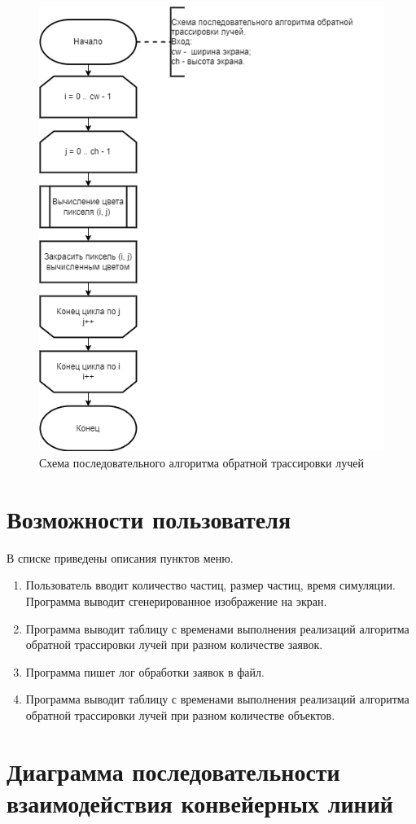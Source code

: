 \captionsetup{justification=centering,singlelinecheck=true}
\begin{figure}[H]
	\centering
	\includegraphics[width=0.7\linewidth]{inc/img/follow}
	\caption{Схема последовательного алгоритма обратной трассировки лучей}
	\label{fig:follow}
\end{figure}

\section{Возможности пользователя}

В списке приведены описания пунктов меню.

\begin{enumerate}
	\item Пользователь вводит количество частиц, размер частиц, время симуляции.
	Программа выводит сгенерированное изображение на экран.
	\item Программа выводит таблицу с временами выполнения реализаций алгоритма обратной трассировки лучей при разном количестве заявок.
	\item Программа пишет лог обработки заявок в файл.
	\item Программа выводит таблицу с временами выполнения реализаций алгоритма обратной трассировки лучей при разном количестве объектов.
\end{enumerate} 

\section{Диаграмма последовательности взаимодействия конвейерных линий}

